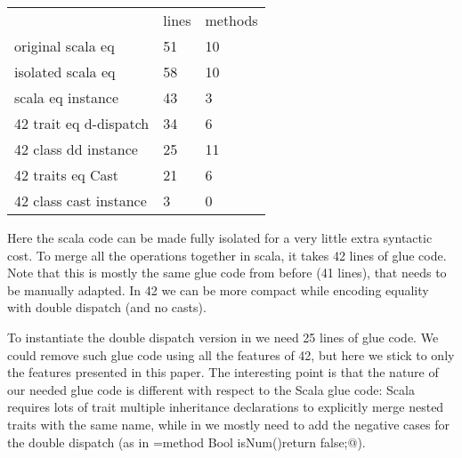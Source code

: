 \begin{minipage}{0.4\textwidth}
\begin{tabular}{l |l |l}
&                              lines  &   methods\\
original scala eq           &    51   &   10\\
isolated scala eq           &   58    &   10\\
scala eq instance           &    43   &    3\\
42 trait eq d-dispatch      &    34   &    6\\
42 class dd instance        &    25   &   11\\
42 traits eq Cast            &    21   &    6\\
42 class cast instance      &     3   &    0\\
\end{tabular}
\end{minipage}
\begin{minipage}{0.6\textwidth}
Here the scala code can be made fully isolated for a very little
extra syntactic cost.
To merge all the operations together in scala, it
takes 42 lines of glue code. Note that this
is mostly the same glue code from before (41 lines), that
needs to be manually adapted.
In 42 we can be more compact while encoding equality with double dispatch (and no casts).
\end{minipage}

To instantiate the double dispatch 
version in \name we need 25 lines of glue code.
We could remove such glue code using all 
the features
of 42, but here we stick to only the features presented in this paper.
The interesting point is that the nature of our needed glue code 
is different with respect to the Scala glue code:
Scala requires lots of trait multiple inheritance declarations to explicitly merge
nested traits with the same name, while in \name we mostly need 
to add the negative cases for the double dispatch (as in
\Q@Sum={method Bool isNum(){return false;}}@).


